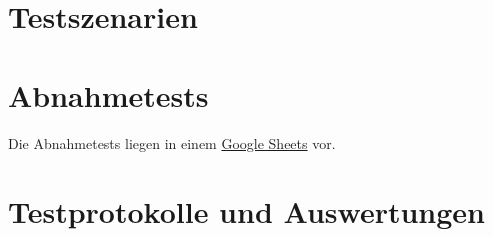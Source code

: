 \section{Testszenarien}\label{sec:testszenarien}



\section{Abnahmetests}\label{sec:abnahmetest}

%
Die Abnahmetests liegen in einem
\href{https://docs.google.com/spreadsheets/d/1FzOZ4AyaUKZ6hcOzm9CIS6r-4n3aabzFG-6NZyX3wJg/edit?usp=sharing}{Google Sheets}
vor.


\section{Testprotokolle und Auswertungen}\label{sec:testprotokolle-und-auswertungen}

